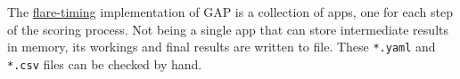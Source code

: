 \documentclass[gap.tex]{subfiles}
\begin{document}
The \href{https://github.com/BlockScope/flare-timing}{flare-timing}
implementation of GAP is a collection of apps, one for each step of the scoring
process. Not being a single app that can store intermediate results in memory,
its workings and final results are written to file. These \texttt{*.yaml} and
\texttt{*.csv} files can be checked by hand.
\end{document}
